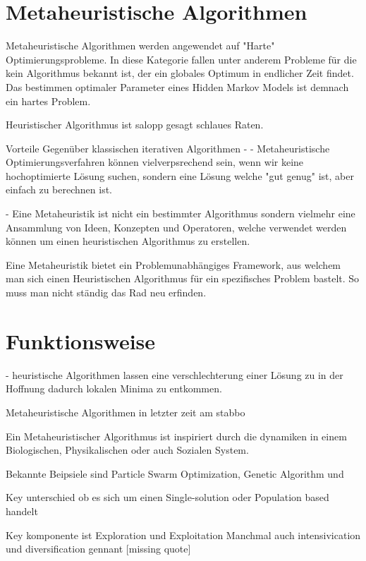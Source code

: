 \section{Metaheuristische Algorithmen}
Metaheuristische Algorithmen werden angewendet auf "Harte" Optimierungsprobleme.
In diese Kategorie fallen unter anderem Probleme für die kein Algorithmus 
bekannt ist, der ein globales Optimum in endlicher Zeit findet.~\cite*{metaheuristics}
Das bestimmen optimaler Parameter eines Hidden Markov Models ist demnach ein hartes Problem.

Heuristischer Algorithmus ist salopp gesagt schlaues Raten.

Vorteile Gegenüber klassischen iterativen Algorithmen
- 
- Metaheuristische Optimierungsverfahren können vielverpsrechend sein, wenn wir 
keine hochoptimierte Lösung suchen, sondern eine Lösung welche "gut genug"
ist, aber einfach zu berechnen ist. \cite{metaheuristics&evolcomp}

- Eine Metaheuristik ist nicht ein bestimmter Algorithmus sondern vielmehr 
eine Ansammlung von Ideen, Konzepten und Operatoren, welche verwendet werden können 
um einen heuristischen Algorithmus zu erstellen.~\cite*{MetaheuristicsExposed}

Eine Metaheuristik bietet ein Problemunabhängiges Framework, aus welchem man 
sich einen Heuristischen Algorithmus für ein spezifisches Problem bastelt. So muss 
man nicht ständig das Rad neu erfinden.

\section{Funktionsweise}
- heuristische Algorithmen lassen eine verschlechterung einer Lösung zu
in der Hoffnung dadurch lokalen Minima zu entkommen. \cite*{metaheuristics}

Metaheuristische Algorithmen in letzter zeit am stabbo

Ein Metaheuristischer Algorithmus ist inspiriert durch die dynamiken in einem Biologischen, Physikalischen
oder auch Sozialen System.

Bekannte Beipsiele sind Particle Swarm Optimization, Genetic Algorithm 
und 

Key unterschied ob es sich um einen Single-solution oder Population based handelt



Key komponente ist Exploration und Exploitation
Manchmal auch intensivication und diversification gennant [missing quote]

